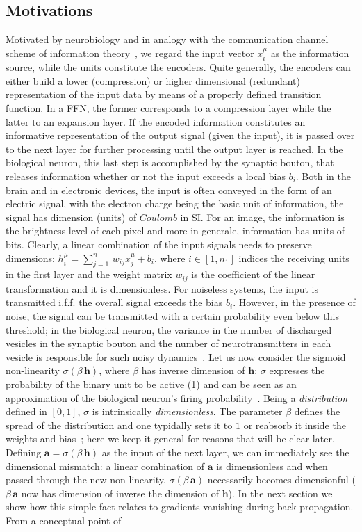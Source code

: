 \documentclass{article}
\begin{document}
\subsection{Motivations} \label{sub:mot}
%
Motivated by neurobiology and in analogy with the communication channel scheme of information theory~\cite{mckay, jaynes}, we regard the input vector $x^{\mu}_i$ as the information source, while the units constitute the encoders. Quite generally, the encoders can either build a lower (compression) or higher dimensional (redundant) representation of the input data by means of a properly defined transition function. In a FFN, the former corresponds to a compression layer while the latter to an expansion layer. If the encoded information constitutes an informative representation of the output signal (given the input), it is passed  over to the next layer for further processing until the output layer is reached. In the biological neuron, this last step is accomplished by the synaptic bouton, that releases information whether or not the input exceeds a local bias $b_i$. Both in the brain and in electronic devices, the input is often conveyed in the form of an electric signal, with the electron charge being the basic unit of information, the signal has dimension (units) of $Coulomb$ in SI. For an image, the information is the brightness level of each pixel and more in generale, information has units of bits. Clearly, a linear combination of the input signals needs to preserve dimensions: $h^{\mu}_i = \sum_{j=1}^{n} \, w_{ij} x^{\mu}_j + b_i$, where $i \in [1, n_1]$ indices the receiving units in the first layer and the weight matrix $ w_{ij}$ is the coefficient of the linear transformation and it is dimensionless. For noiseless systems, the input is transmitted i.f.f. the overall signal exceeds the bias $b_i$. However, in the presence of noise, the signal can be transmitted with a certain probability even below this threshold; in the biological neuron, the variance in the number of discharged vesicles in the synaptic bouton and the number of neurotransmitters in each vesicle is responsible for such noisy dynamics~\cite{amit1}. Let us now consider the sigmoid non-linearity $\sigma(\beta \, \mathbf{h} )$, where $\beta$  has inverse dimension of $\mathbf{h}$;  $\sigma$ expresses the probability of the binary unit to be active (1) and can be seen as an approximation of the biological neuron's firing probability~\cite{amit1}. Being a {\it distribution} defined in $[0,1]$, $\sigma$ is intrinsically {\it dimensionless}. The parameter $\beta$ defines the spread of the distribution and one typidally sets it to $1$ or reabsorb it inside the weights and bias~\cite{zecchina}; here we keep it general for reasons that will be clear later. Defining $\mathbf{a} = \sigma(\beta \, \mathbf{h} )$ as the input of the next layer, we can immediately see the dimensional mismatch: a linear combination of $\mathbf{a}$ is dimensionless and when passed through the new non-linearity, $\sigma(\beta \, \mathbf{a} )$ necessarily becomes dimensionful ($\beta \, \mathbf{a}$ now has dimension of inverse the dimension of $\mathbf{h}$). In the next section we show how this simple fact relates to gradients vanishing during back propagation. From a conceptual point of 
\end{document}

